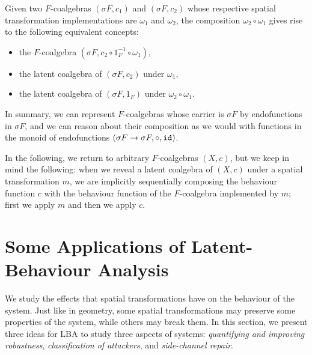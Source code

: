 Given two $F$-coalgebras $(\sigma F, c_1)$ and $(\sigma F, c_2)$ whose respective spatial transformation implementations are $\omega_1$ and $\omega_2$, the composition $\omega_2\circ \omega_1$ gives rise to the following equivalent concepts:
\begin{itemize}
    \item the $F$-coalgebra $(\sigma F, c_2\circ 1_F^{-1}\circ\omega_1)$,
    \item the latent coalgebra of $(\sigma F, c_2)$ under $\omega_1$,
    \item the latent coalgebra of $(\sigma F, 1_F)$ under $\omega_2\circ \omega_1$.
\end{itemize}
In summary, we can represent $F$-coalgebras whose carrier is $\sigma F$ by endofunctions in $\sigma F$, and we can reason about their composition as we would with functions in the monoid of endofunctions $(\sigma F\rightarrow \sigma F, \circ, {\texttt{id}})$. 

In the following, we return to arbitrary $F$-coalgebras $(X,c)$, but we keep in mind the following: when we reveal a latent coalgebra of $(X,c)$ under a spatial transformation $m$, we are implicitly sequentially composing the behaviour function $c$ with the behaviour function of the $F$-coalgebra implemented by $m$; first we apply $m$ and then we apply $c$.

\section{Some Applications of Latent-Behaviour Analysis}
We study the effects that spatial transformations have on the behaviour of the system. Just like in geometry, some spatial transformations may preserve some properties of the system, while others may break them. In this section, we present three ideas for LBA to study three aspects of systems: \emph{quantifying and improving robustness}, \emph{classification of attackers}, and \emph{side-channel repair}.


